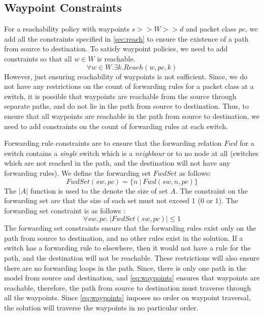 \documentclass[]{sig}
\begin{document}
\subsection{Waypoint Constraints} 
For a reachability policy with waypoints $s >> W >> d$ and packet class $pc$, we add all the constraints specified in \cref{sec:reach} to ensure the existence of a path from source to destination. To satisfy waypoint policies, we need to add constraints so that all $w \in W$ is reachable. 
\begin{equation} \label{eq:waypoints}
	\forall w \in W. \exists k. Reach(w, pc, k)
\end{equation}
However, just ensuring reachability of waypoints is not sufficient. Since, we do not have any restrictions on the count of forwarding rules for a packet class at a switch, it is possible that waypoints are reachable from the source through separate paths, and do not lie in the path from source to destination. Thus, to ensure that all waypoints are reachable in the path from source to destination, we need to add constraints on the count of forwarding rules at each switch. 

Forwarding rule constraints are to ensure that the forwarding relation $Fwd$ for a switch contains a \emph{single} switch which is a \emph{neighbour} or to no node at all (switches which are not reached in the path, and the destination will not have any forwarding rules). We define the forwarding set $FwdSet$ as follows:
\begin{equation}
	FwdSet(sw,pc) = \{n \ | \ Fwd(sw,n,pc)\}
\end{equation}
The $|A|$ function is used to the denote the size of set $A$. The constraint on the forwarding set are that the size of each set must not exceed 1 (0 or 1). The forwarding set constraint is as follows : 
\begin{equation}
		\forall sw,pc . \ |FwdSet(sw,pc)| \leq 1 \label{eq:fwdset}
\end{equation}
The forwarding set constraints ensure that the forwarding rules exist only on the path from source to destination, and no other rules exist in the solution. If a switch has a forwarding rule to  elsewhere, then it would not have a rule for the path, and the destination will not be reachable. These restrictions will also ensure there are no forwarding loops in the path. 
Since, there is only one path in the model from source and destination, and \cref{eq:waypoints} ensures that waypoints are reachable, therefore, the path from source to destination must traverse through all the waypoints. Since \cref{eq:waypoints} imposes no order on waypoint traversal, the solution will traverse the waypoints in no particular order. 
\end{document}
